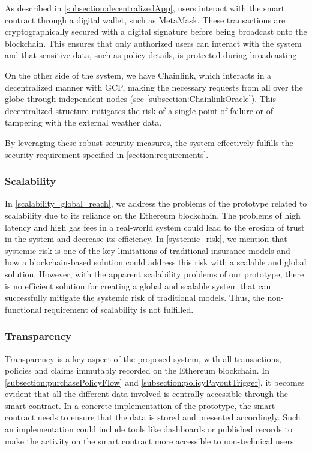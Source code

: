 As described in \cref{subsection:decentralizedApp}, users interact with the smart contract through a digital wallet, such as MetaMask. These transactions are cryptographically secured with a digital signature before being broadcast onto the blockchain. This ensures that only authorized users can interact with the system and that sensitive data, such as policy details, is protected during broadcasting.

On the other side of the system, we have Chainlink, which interacts in a decentralized manner with GCP, making the necessary requests from all over the globe through independent nodes (see \cref{subsection:ChainlinkOracle}). This decentralized structure mitigates the risk of a single point of failure or of tampering with the external weather data.

By leveraging these robust security measures, the system effectively fulfills the security requirement specified in \cref{section:requirements}.

\subsubsection{Scalability}\label{Scalability_requiremnt}
In \cref{scalability_global_reach}, we address the problems of the prototype related to scalability due to its reliance on the Ethereum blockchain. The problems of high latency and high gas fees in a real-world system could lead to the erosion of trust in the system and decrease its efficiency. In \cref{systemic_risk}, we mention that systemic risk is one of the key limitations of traditional insurance models and how a blockchain-based solution could address this risk with a scalable and global solution. However, with the apparent scalability problems of our prototype, there is no efficient solution for creating a global and scalable system that can successfully mitigate the systemic risk of traditional models. Thus, the non-functional requirement of scalability is not fulfilled.

\subsubsection{Transparency}
Transparency is a key aspect of the proposed system, with all transactions, policies and claims immutably recorded on the Ethereum blockchain. In \cref{subsection:purchasePolicyFlow} and \cref{subsection:policyPayoutTrigger}, it becomes evident that all the different data involved is centrally accessible through the smart contract. In a concrete implementation of the prototype, the smart contract needs to ensure that the data is stored and presented accordingly. Such an implementation could include tools like dashboards or published records to make the activity on the smart contract more accessible to non-technical users.

